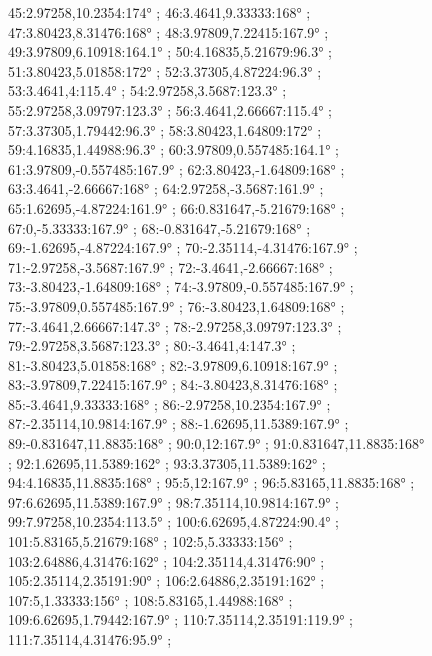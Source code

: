 \documentclass[a4paper,10pt,ngerman]{scrartcl}
\begin{document}
\begin{figure}[!h]
{            45:2.97258,10.2354:174° ;
            46:3.4641,9.33333:168° ;
            47:3.80423,8.31476:168° ;
            48:3.97809,7.22415:167.9° ;
            49:3.97809,6.10918:164.1° ;
            50:4.16835,5.21679:96.3° ;
            51:3.80423,5.01858:172° ;
            52:3.37305,4.87224:96.3° ;
            53:3.4641,4:115.4° ;
            54:2.97258,3.5687:123.3° ;
            55:2.97258,3.09797:123.3° ;
            56:3.4641,2.66667:115.4° ;
            57:3.37305,1.79442:96.3° ;
            58:3.80423,1.64809:172° ;
            59:4.16835,1.44988:96.3° ;
            60:3.97809,0.557485:164.1° ;
            61:3.97809,-0.557485:167.9° ;
            62:3.80423,-1.64809:168° ;
            63:3.4641,-2.66667:168° ;
            64:2.97258,-3.5687:161.9° ;
            65:1.62695,-4.87224:161.9° ;
            66:0.831647,-5.21679:168° ;
            67:0,-5.33333:167.9° ;
            68:-0.831647,-5.21679:168° ;
            69:-1.62695,-4.87224:167.9° ;
            70:-2.35114,-4.31476:167.9° ;
            71:-2.97258,-3.5687:167.9° ;
            72:-3.4641,-2.66667:168° ;
            73:-3.80423,-1.64809:168° ;
            74:-3.97809,-0.557485:167.9° ;
            75:-3.97809,0.557485:167.9° ;
            76:-3.80423,1.64809:168° ;
            77:-3.4641,2.66667:147.3° ;
            78:-2.97258,3.09797:123.3° ;
            79:-2.97258,3.5687:123.3° ;
            80:-3.4641,4:147.3° ;
            81:-3.80423,5.01858:168° ;
            82:-3.97809,6.10918:167.9° ;
            83:-3.97809,7.22415:167.9° ;
            84:-3.80423,8.31476:168° ;
            85:-3.4641,9.33333:168° ;
            86:-2.97258,10.2354:167.9° ;
            87:-2.35114,10.9814:167.9° ;
            88:-1.62695,11.5389:167.9° ;
            89:-0.831647,11.8835:168° ;
            90:0,12:167.9° ;
            91:0.831647,11.8835:168° ;
            92:1.62695,11.5389:162° ;
            93:3.37305,11.5389:162° ;
            94:4.16835,11.8835:168° ;
            95:5,12:167.9° ;
            96:5.83165,11.8835:168° ;
            97:6.62695,11.5389:167.9° ;
            98:7.35114,10.9814:167.9° ;
            99:7.97258,10.2354:113.5° ;
            100:6.62695,4.87224:90.4° ;
            101:5.83165,5.21679:168° ;
            102:5,5.33333:156° ;
            103:2.64886,4.31476:162° ;
            104:2.35114,4.31476:90° ;
            105:2.35114,2.35191:90° ;
            106:2.64886,2.35191:162° ;
            107:5,1.33333:156° ;
            108:5.83165,1.44988:168° ;
            109:6.62695,1.79442:167.9° ;
            110:7.35114,2.35191:119.9° ;
            111:7.35114,4.31476:95.9° ;
}
\end{figure}
\end{document}
